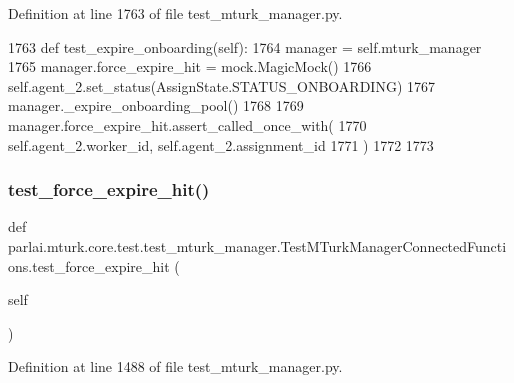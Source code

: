 Definition at line 1763 of file test\+\_\+mturk\+\_\+manager.\+py.


\begin{DoxyCode}
1763     \textcolor{keyword}{def }test\_expire\_onboarding(self):
1764         manager = self.mturk\_manager
1765         manager.force\_expire\_hit = mock.MagicMock()
1766         self.agent\_2.set\_status(AssignState.STATUS\_ONBOARDING)
1767         manager.\_expire\_onboarding\_pool()
1768 
1769         manager.force\_expire\_hit.assert\_called\_once\_with(
1770             self.agent\_2.worker\_id, self.agent\_2.assignment\_id
1771         )
1772 
1773 
\end{DoxyCode}
\mbox{\label{classparlai_1_1mturk_1_1core_1_1test_1_1test__mturk__manager_1_1TestMTurkManagerConnectedFunctions_aa8cc78fc12967651b736955c83914a86}} 
\subsubsection{\texorpdfstring{test\+\_\+force\+\_\+expire\+\_\+hit()}{test\_force\_expire\_hit()}}
{\footnotesize\ttfamily def parlai.\+mturk.\+core.\+test.\+test\+\_\+mturk\+\_\+manager.\+Test\+M\+Turk\+Manager\+Connected\+Functions.\+test\+\_\+force\+\_\+expire\+\_\+hit (\begin{DoxyParamCaption}\item[{}]{self }\end{DoxyParamCaption})}



Definition at line 1488 of file test\+\_\+mturk\+\_\+manager.\+py.


